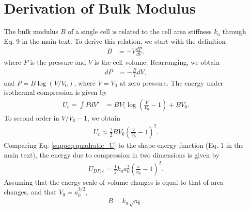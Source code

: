 \documentclass[%
 reprint,
superscriptaddress,
 amsmath,amssymb,
pre,
]{revtex4-2}
\begin{document}
\section{Derivation of Bulk Modulus}
The bulk modulus $B$ of a single cell is related to the cell area stiffness $k_a$ through Eq. 9 in the main text. To derive this relation, we start with the definition 
\begin{align*}
    B&=-V\frac{dP}{dV},
\end{align*}
where $P$ is the pressure and $V$ is the cell volume. Rearranging, we obtain
\begin{align*}
    dP &= -\frac{B}{V} dV,
\end{align*}
and $P = B \log(V/V_0)$, where $V = V_0$ at zero pressure. The energy under isothermal compression is given by  
\begin{align*}
    U_{c} = \int PdV' &= BV(\log(\frac{V}{V_0} - 1) + BV_0.
\end{align*}
To second order in $V/V_0 - 1$, we obtain
\begin{align}
    U_c \approx \frac{1}{2}BV_0\left(\frac{V}{V_0} - 1\right)^2.
    \label{suppeq:quadratic_U}
\end{align}
Comparing Eq. \ref{suppeq:quadratic_U} to the shape-energy function (Eq. 1 in the main text), the energy due to compression in two dimensions is given by 
\begin{align*}
    U_{DP, c} = \frac{1}{2} k_a a_0^2 \left(\frac{a}{a_0} - 1\right)^2.
\end{align*}
Assuming that the energy scale of volume changes is equal to that of area changes, and that $V_0 = a_0^{3/2}$, 
\begin{align*}
    B = k_a\sqrt{a_0}.
\end{align*}
\end{document}
